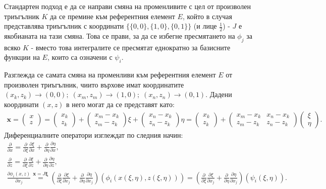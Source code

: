 \documentclass{report}
\begin{document}
	Стандартен подход е да се направи смяна на променливите с цел от произволен триъгълник $K$ да се премине към референтния елемент $E$, който в случая представлява триъгълник с координати $\{\{0,0\}, \{1,0\}, \{0,1\}\}$ (и лице $\frac{1}{2}$) - $J$ е якобианата на тази смяна. Това се прави, за да се избегне пресмятането на $\phi_j$ за всяко $K$ - вместо това интегралите се пресмятат еднократно за базисните функции на $E$, които са означени с $\psi_i$.
	
	Разглежда се самата смяна на променливи към референтния елемент $E$ от произволен триъгълник, чиито върхове имат координатите $(x_k,z_k)\rightarrow(0,0);\; (x_m,z_m)\rightarrow(1,0);\; (x_n, z_n)\rightarrow(0,1)$. Дадени координати $(x,z)$ в него могат да се представят като:
	\begin{align*}
		\mathbf{x}=
		\begin{pmatrix}
			x\\
			z
		\end{pmatrix}
		= \begin{pmatrix}
			x_k\\
			z_k
		\end{pmatrix}
		+  \begin{pmatrix}
			x_m-x_k\\
			z_m-z_k
		\end{pmatrix}\xi
		+\begin{pmatrix}
			x_n-x_k\\
			z_n-z_k
		\end{pmatrix}\eta
		= \begin{pmatrix}
			x_k\\
			z_k
		\end{pmatrix}
		+  \begin{pmatrix}
			x_m - x_k & x_n - x_k\\
			z_m - z_k & z_n - z_k
		\end{pmatrix}
		\begin{pmatrix}
			\xi \\
			\eta
		\end{pmatrix}.
	\end{align*}
	Диференциалните оператори изглеждат по следния начин:
	\begin{align*}
		\frac{\partial}{\partial x} = \frac{\partial}{\partial \xi}\frac{\partial \xi}{\partial x} + \frac{\partial}{\partial \eta}\frac{\partial \eta}{\partial x},\\
		\frac{\partial}{\partial z} = \frac{\partial}{\partial \xi}\frac{\partial \xi}{\partial z} + \frac{\partial}{\partial \eta}\frac{\partial \eta}{\partial z},\\
		\frac{\partial \phi_i(x,z)}{\partial x_j} \overset{\mathbf{x}=J\mathbf{\xi}}{=}
		(\frac{\partial}{\partial \xi}\frac{\partial \xi}{\partial x_j} + \frac{\partial}{\partial \eta}\frac{\partial \eta}{\partial x_j})(\phi_i(x(\xi,\eta),z(\xi,\eta)))=
		(\frac{\partial}{\partial \xi}\frac{\partial \xi}{\partial x_j} + \frac{\partial}{\partial \eta}\frac{\partial \eta}{\partial x_j})(\psi_i(\xi,\eta)).
	\end{align*}
\end{document}
